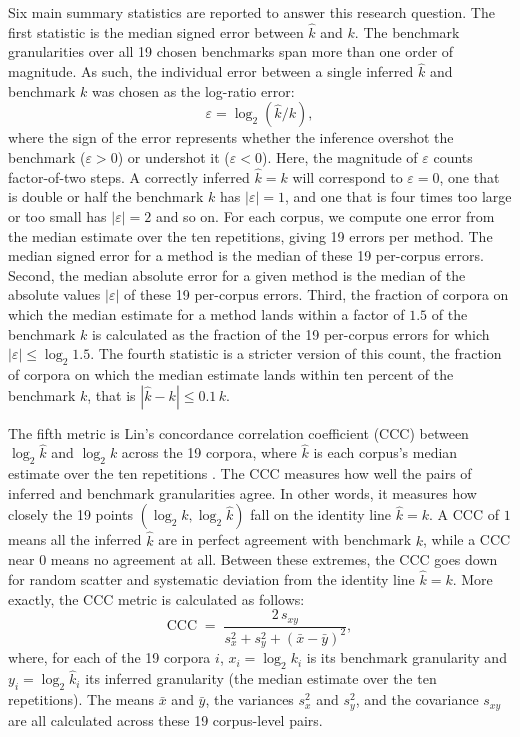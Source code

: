 \documentclass[11pt,a4paper,oneside]{report}
\begin{document}
Six main summary statistics are reported to answer this research question. The first statistic is the median signed error between $\hat{k}$ and $k$. The benchmark granularities over all 19 chosen benchmarks span more than one order of magnitude. As such, the individual error between a single inferred $\hat{k}$ and benchmark $k$ was chosen as the log-ratio error:
\[
\varepsilon = \log_2\!\left(\hat{k} / k\right),
\]
where the sign of the error represents whether the inference overshot the benchmark ($\varepsilon > 0$) or undershot it ($\varepsilon < 0$). Here, the magnitude of $\varepsilon$ counts factor-of-two steps. A correctly inferred $\hat{k} = k$ will correspond to $\varepsilon = 0$, one that is double or half the benchmark $k$ has $|\varepsilon| = 1$, and one that is four times too large or too small has $|\varepsilon| = 2$ and so on. For each corpus, we compute one error from the median estimate over the ten repetitions, giving 19 errors per method. The median signed error for a method is the median of these 19 per-corpus errors. Second, the median absolute error for a given method is the median of the absolute values $|\varepsilon|$ of these 19 per-corpus errors. Third, the fraction of corpora on which the median estimate for a method lands within a factor of $1.5$ of the benchmark $k$ is calculated as the fraction of the 19 per-corpus errors for which $|\varepsilon| \le \log_2 1.5$. The fourth statistic is a stricter version of this count, the fraction of corpora on which the median estimate lands within ten percent of the benchmark $k$, that is $|\hat{k} - k| \le 0.1\,k$.

The fifth metric is Lin's concordance correlation coefficient (CCC) between $\log_2 \hat{k}$ and $\log_2 k$ across the 19 corpora, where $\hat{k}$ is each corpus's median estimate over the ten repetitions \citep{lin1989concordance}. The CCC measures how well the pairs of inferred and benchmark granularities agree. In other words, it measures how closely the 19 points $(\log_2 k, \log_2 \hat{k})$ fall on the identity line $\hat{k} = k$. A CCC of $1$ means all the inferred $\hat{k}$ are in perfect agreement with benchmark $k$, while a CCC near $0$ means no agreement at all. Between these extremes, the CCC goes down for random scatter and systematic deviation from the identity line $\hat{k} = k$. More exactly, the CCC metric is calculated as follows:
\[
\mathrm{CCC} \;=\; \frac{2\,s_{xy}}{s_x^2 + s_y^2 + \left(\bar{x} - \bar{y}\right)^2},
\]
where, for each of the 19 corpora $i$, $x_i = \log_2 k_i$ is its benchmark granularity and $y_i = \log_2 \hat{k}_i$ its inferred granularity (the median estimate over the ten repetitions). The means $\bar{x}$ and $\bar{y}$, the variances $s_x^2$ and $s_y^2$, and the covariance $s_{xy}$ are all calculated across these 19 corpus-level pairs.
\end{document}
